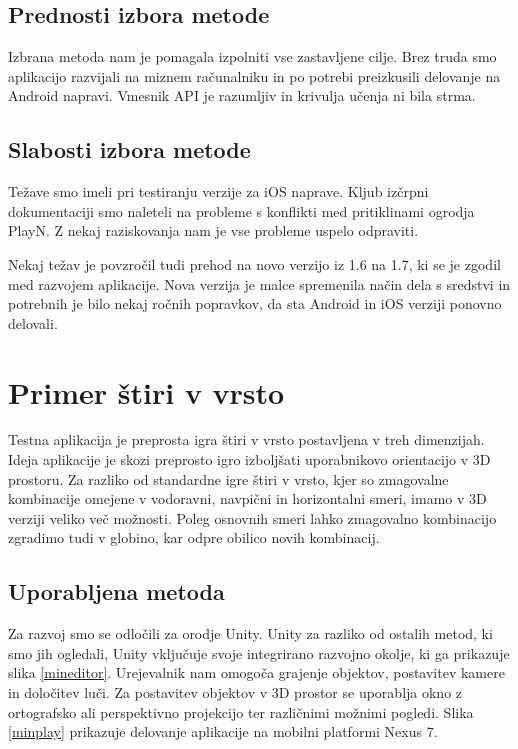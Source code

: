 \subsection{Prednosti izbora metode}

Izbrana metoda nam je pomagala izpolniti vse zastavljene cilje. Brez truda smo aplikacijo razvijali na miznem računalniku in po potrebi preizkusili delovanje na Android napravi. Vmesnik API je razumljiv in krivulja učenja ni bila strma. 

\subsection{Slabosti izbora metode}

Težave smo imeli pri testiranju verzije za iOS naprave. Kljub izčrpni dokumentaciji smo naleteli na probleme s konflikti med pritiklinami ogrodja PlayN. Z nekaj raziskovanja nam je vse probleme uspelo odpraviti. 

Nekaj težav je povzročil tudi prehod na novo verzijo iz 1.6 na 1.7, ki se je zgodil med razvojem aplikacije. Nova verzija je malce spremenila način dela s sredstvi in potrebnih je bilo nekaj ročnih popravkov, da sta Android in iOS verziji ponovno delovali.

\section{Primer štiri v vrsto}

Testna aplikacija je preprosta igra štiri v vrsto postavljena v treh dimenzijah. Ideja aplikacije je skozi preprosto igro izboljšati uporabnikovo orientacijo v 3D prostoru. Za razliko od standardne igre štiri v vrsto, kjer so zmagovalne kombinacije omejene v vodoravni, navpični in horizontalni smeri, imamo v 3D verziji veliko več možnosti. Poleg osnovnih smeri lahko zmagovalno kombinacijo zgradimo tudi v globino, kar odpre obilico novih kombinacij.

\subsection{Uporabljena metoda}

Za razvoj smo se odločili za orodje Unity. Unity za razliko od ostalih metod, ki smo  jih ogledali, Unity vključuje svoje integrirano razvojno okolje, ki ga prikazuje slika \ref{mineditor}. Urejevalnik nam omogoča grajenje objektov, postavitev kamere in določitev luči. Za postavitev objektov v 3D prostor se uporablja okno z ortografsko ali perspektivno projekcijo ter različnimi možnimi pogledi. Slika \ref{minplay} prikazuje delovanje aplikacije na mobilni platformi Nexus 7.

